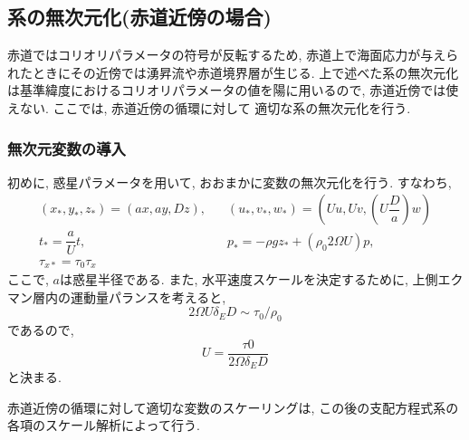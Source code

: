 \subsection{系の無次元化(赤道近傍の場合)}

赤道ではコリオリパラメータの符号が反転するため, 
赤道上で海面応力が与えられたときにその近傍では湧昇流や赤道境界層が生じる. 
上で述べた系の無次元化は基準緯度におけるコリオリパラメータの値を陽に用いるので, 
赤道近傍では使えない. 
ここでは, 赤道近傍の循環に対して 適切な系の無次元化を行う. 


\subsubsection*{無次元変数の導入}

初めに, 惑星パラメータを用いて, おおまかに変数の無次元化を行う. 
すなわち, 
\begin{equation}
\begin{split}
   (x_*, y_*, z_*) = (ax, ay, Dz),& \;\;\; (u_*, v_*, w_*) = (U u, Uv, \left(U\dfrac{D}{a}\right) w) \\
   t_* = \dfrac{a}{U} t,& \;\;\; p_* = -\rho g z_* + (\rho_0 2 \Omega U) p, \\
   \tau_{x*} = \tau_0 \tau_x &
\end{split}
\label{eq:scale_variable_equator}
\end{equation}
ここで, $a$は惑星半径である. 
また, 水平速度スケールを決定するために, 上側エクマン層内の運動量パランスを考えると, 
$$
  2 \Omega U \delta_E D \sim \tau_0 / \rho_0
$$
であるので,  
\begin{equation}
   U = \dfrac{\tau 0}{2\Omega \delta_E D}
\end{equation}
と決まる. 

赤道近傍の循環に対して適切な変数のスケーリングは, この後の支配方程式系の各項のスケール解析によって行う. 

